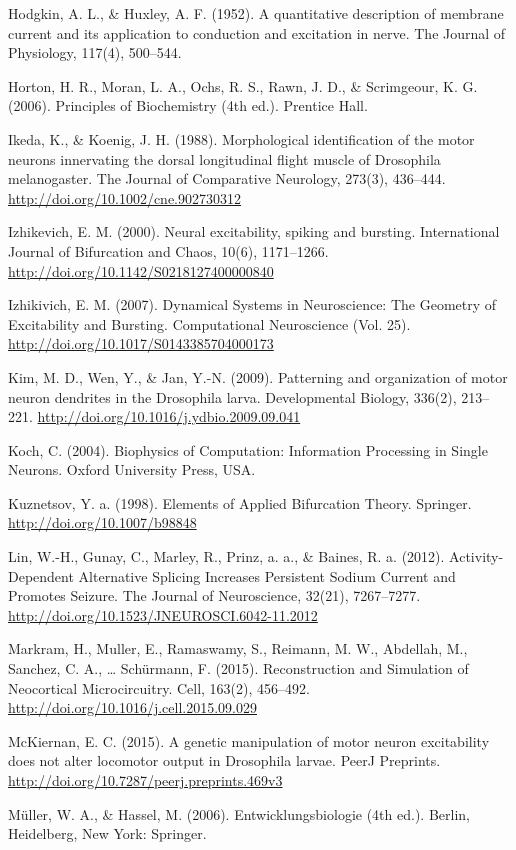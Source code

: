 \documentclass[12pt,a4paper,]{report}
\begin{document}
Hodgkin, A. L., \& Huxley, A. F. (1952). A quantitative description of
membrane current and its application to conduction and excitation in
nerve. The Journal of Physiology, 117(4), 500--544.

Horton, H. R., Moran, L. A., Ochs, R. S., Rawn, J. D., \& Scrimgeour, K.
G. (2006). Principles of Biochemistry (4th ed.). Prentice Hall.

Ikeda, K., \& Koenig, J. H. (1988). Morphological identification of the
motor neurons innervating the dorsal longitudinal flight muscle of
Drosophila melanogaster. The Journal of Comparative Neurology, 273(3),
436--444. \url{http://doi.org/10.1002/cne.902730312}

Izhikevich, E. M. (2000). Neural excitability, spiking and bursting.
International Journal of Bifurcation and Chaos, 10(6), 1171--1266.
\url{http://doi.org/10.1142/S0218127400000840}

Izhikivich, E. M. (2007). Dynamical Systems in Neuroscience: The
Geometry of Excitability and Bursting. Computational Neuroscience (Vol.
25). \url{http://doi.org/10.1017/S0143385704000173}

Kim, M. D., Wen, Y., \& Jan, Y.-N. (2009). Patterning and organization
of motor neuron dendrites in the Drosophila larva. Developmental
Biology, 336(2), 213--221.
\url{http://doi.org/10.1016/j.ydbio.2009.09.041}

Koch, C. (2004). Biophysics of Computation: Information Processing in
Single Neurons. Oxford University Press, USA.

Kuznetsov, Y. a. (1998). Elements of Applied Bifurcation Theory.
Springer. \url{http://doi.org/10.1007/b98848}

Lin, W.-H., Gunay, C., Marley, R., Prinz, a. a., \& Baines, R. a.
(2012). Activity-Dependent Alternative Splicing Increases Persistent
Sodium Current and Promotes Seizure. The Journal of Neuroscience,
32(21), 7267--7277. \url{http://doi.org/10.1523/JNEUROSCI.6042-11.2012}

Markram, H., Muller, E., Ramaswamy, S., Reimann, M. W., Abdellah, M.,
Sanchez, C. A., \ldots{} Schürmann, F. (2015). Reconstruction and
Simulation of Neocortical Microcircuitry. Cell, 163(2), 456--492.
\url{http://doi.org/10.1016/j.cell.2015.09.029}

McKiernan, E. C. (2015). A genetic manipulation of motor neuron
excitability does not alter locomotor output in Drosophila larvae. PeerJ
Preprints. \url{http://doi.org/10.7287/peerj.preprints.469v3}

Müller, W. A., \& Hassel, M. (2006). Entwicklungsbiologie (4th ed.).
Berlin, Heidelberg, New York: Springer.
\end{document}
